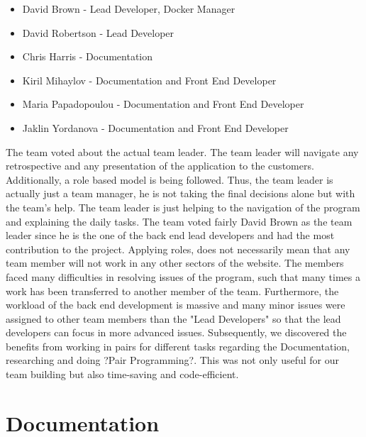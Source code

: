 \documentclass{l3proj}
\begin{document}
\begin{itemize}

\item David Brown - Lead Developer, Docker Manager

\item David Robertson - Lead Developer

\item Chris Harris - Documentation

\item Kiril Mihaylov - Documentation and Front End Developer

\item Maria Papadopoulou - Documentation and Front End Developer

\item Jaklin Yordanova - Documentation and Front End Developer

\end{itemize}
The team voted about the actual team leader. The team leader will navigate any retrospective and any presentation of the application to the customers. Additionally, a role based model is being followed. Thus, the team leader is actually just a team manager, he is not taking the final decisions alone but with the team's help. The team leader is just helping to the navigation of the program and explaining the daily tasks. The team voted fairly David Brown as the team leader since he is the one of the back end lead developers and had the most contribution to the project. Applying roles, does not necessarily mean that any team member will not work in any other sectors of the website. The members faced many difficulties in resolving issues of the program, such that many times a work has been transferred to another member of the team. Furthermore, the workload of the back end development is massive and many minor issues were assigned to other team members than the "Lead Developers" so that the lead developers can focus in more advanced issues. Subsequently, we discovered the benefits from working in pairs for different tasks regarding the Documentation, researching and doing ?Pair Programming?. This was not only useful for our team building but also time-saving and code-efficient.


\section{Documentation}
\label{documentation}
\end{document}
